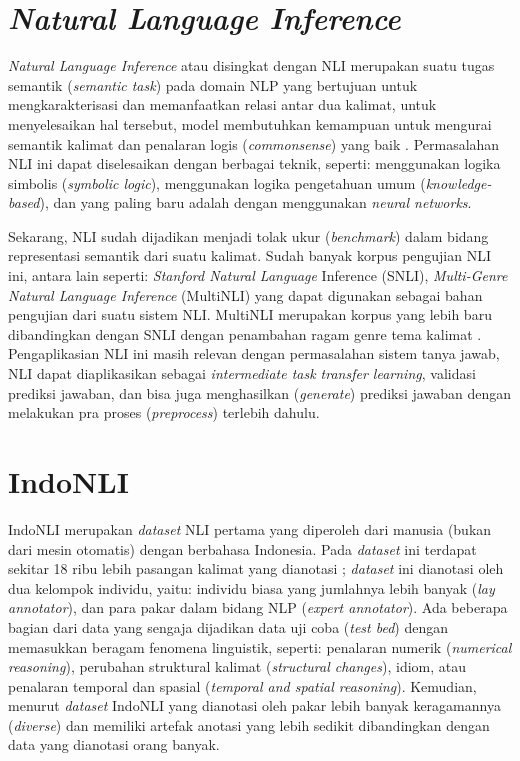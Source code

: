 \section{\emph{Natural Language Inference}}
\emph{Natural Language Inference} atau disingkat dengan NLI merupakan suatu tugas semantik (\emph{semantic task}) pada domain NLP yang bertujuan untuk mengkarakterisasi dan memanfaatkan relasi antar dua kalimat, untuk menyelesaikan hal tersebut, model membutuhkan kemampuan untuk mengurai semantik kalimat dan penalaran logis (\emph{commonsense}) yang baik \citep{bowman-etal-2015-large}. Permasalahan NLI ini dapat diselesaikan dengan berbagai teknik, seperti: menggunakan logika simbolis (\emph{symbolic logic}), menggunakan logika pengetahuan umum (\emph{knowledge-based}), dan yang paling baru adalah dengan menggunakan \emph{neural networks}. 

Sekarang, NLI sudah dijadikan menjadi tolak ukur (\emph{benchmark}) dalam bidang representasi semantik dari suatu kalimat. Sudah banyak korpus pengujian NLI ini, antara lain seperti: \emph{Stanford Natural Language} Inference (SNLI), \emph{Multi-Genre Natural Language Inference} (MultiNLI) yang dapat digunakan sebagai bahan pengujian dari suatu sistem NLI. MultiNLI merupakan korpus yang lebih baru dibandingkan dengan SNLI dengan penambahan ragam genre tema kalimat \citep{williams-etal-2018-broad}. Pengaplikasian NLI ini masih relevan dengan permasalahan sistem tanya jawab, NLI dapat diaplikasikan sebagai \emph{intermediate task transfer learning}, validasi prediksi jawaban, dan bisa juga menghasilkan (\emph{generate}) prediksi jawaban dengan melakukan pra proses (\emph{preprocess}) terlebih dahulu.

\section{IndoNLI}
IndoNLI merupakan \emph{dataset} NLI pertama yang diperoleh dari manusia (bukan dari mesin otomatis) dengan berbahasa Indonesia. Pada \emph{dataset} ini terdapat sekitar 18 ribu lebih pasangan kalimat yang dianotasi \citep{mahendra-etal-2021-indonli}; \emph{dataset} ini dianotasi oleh dua kelompok individu, yaitu: individu biasa yang jumlahnya lebih banyak (\emph{lay annotator}), dan para pakar dalam bidang NLP (\emph{expert annotator}). Ada beberapa bagian dari data yang sengaja dijadikan data uji coba (\emph{test bed}) dengan memasukkan beragam fenomena linguistik, seperti: penalaran numerik (\emph{numerical reasoning}), perubahan struktural kalimat (\emph{structural changes}), idiom, atau penalaran temporal dan spasial (\emph{temporal and spatial reasoning}). Kemudian, menurut \citet{mahendra-etal-2021-indonli} \emph{dataset} IndoNLI yang dianotasi oleh pakar lebih banyak keragamannya (\emph{diverse}) dan memiliki artefak anotasi yang lebih sedikit dibandingkan dengan data yang dianotasi orang banyak.

